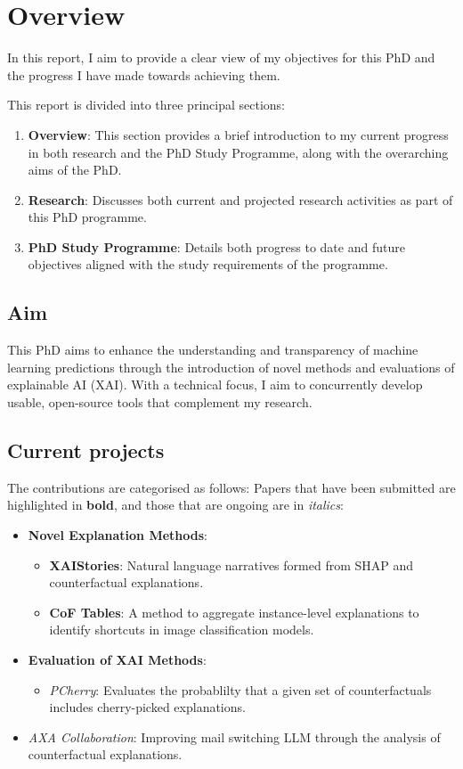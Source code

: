 \section{Overview}

In this report, I aim to provide a clear view of my objectives for this PhD and the progress 
I have made towards achieving them.

This report is divided into three principal sections: 
\begin{enumerate}
    \item \textbf{Overview}: This section provides a brief introduction to my current progress in both research 
    and the PhD Study Programme, along with the overarching aims of the PhD.
    \item \textbf{Research}: Discusses both current and projected research activities as part of this PhD programme.
    \item \textbf{PhD Study Programme}: Details both progress to date and future objectives aligned with the study 
    requirements of the programme.
\end{enumerate}


\subsection*{Aim}

This PhD aims to enhance the understanding and transparency of machine learning predictions through the 
introduction of novel methods and evaluations of explainable AI (XAI). 
With a technical focus, I aim to concurrently develop usable, open-source tools that complement my research.

\subsection*{Current projects}
The contributions are categorised as follows: Papers that have been submitted are highlighted 
in \textbf{bold}, and those that are ongoing are in \textit{italics}:
\begin{itemize}
    \item \textbf{Novel Explanation Methods}:
    \begin{itemize}
        \item \textbf{XAIStories}: Natural language narratives formed from SHAP and counterfactual explanations.
        \item \textbf{CoF Tables}: A method to aggregate instance-level explanations to identify shortcuts in 
        image classification models.
    \end{itemize}
    \item \textbf{Evaluation of XAI Methods}:
    \begin{itemize}
        \item \textit{PCherry}: Evaluates the probablilty that a given set of counterfactuals includes 
        cherry-picked explanations.
    \end{itemize}
    \item \textit{AXA Collaboration}: Improving mail switching LLM through the analysis of counterfactual explanations.
\end{itemize}

